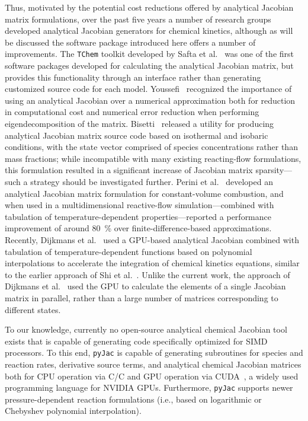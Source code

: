 \documentclass[preprint,12pt]{elsarticle}
\def\CC{{C\nolinebreak[4]\hspace{-.05em}\raisebox{.4ex}{\footnotesize ++}}}
\begin{document}
Thus, motivated by the potential cost reductions offered by analytical Jacobian matrix formulations, over the past five years a number of research groups developed analytical Jacobian generators for chemical kinetics, although as will be discussed the software package introduced here offers a number of improvements.
The \texttt{TChem} toolkit developed by Safta et al.~\cite{Safta:2011vn} was one of the first software packages developed for calculating the analytical Jacobian matrix, but provides this functionality through an interface rather than generating customized source code for each model.
Youssefi~\cite{Youssefi:2011tm} recognized the importance of using an analytical Jacobian over a numerical approximation both for reduction in computational cost and numerical error reduction when performing eigendecomposition of the matrix.
Bisetti~\cite{Bisetti:2012jw} released a utility for producing analytical Jacobian matrix source code based on isothermal and isobaric conditions, with the state vector comprised of species concentrations rather than mass fractions; while incompatible with many existing reacting-flow formulations, this formulation resulted in a significant increase of Jacobian matrix sparsity---such a strategy should be investigated further.
Perini et al.~\cite{Perini:2012gy} developed an analytical Jacobian matrix formulation for constant-volume combustion, and when used in a multidimensional reactive-flow simulation---combined with tabulation of temperature-dependent properties---reported a performance improvement of around \SI{80}{\percent} over finite-difference-based approximations.
Recently, Dijkmans et al.~\cite{Dijkmans:2014bb} used a GPU-based analytical Jacobian combined with tabulation of temperature-dependent functions based on polynomial interpolations to accelerate the integration of chemical kinetics equations, similar to the earlier approach of Shi et al.~\cite{Shi:2011aa}.
Unlike the current work, the approach of Dijkmans et al.~\cite{Dijkmans:2014bb} used the GPU to calculate the elements of a single Jacobian matrix in parallel, rather than a large number of matrices corresponding to different states.

To our knowledge, currently no open-source analytical chemical Jacobian tool exists that is capable of generating code specifically optimized for SIMD processors.
To this end, \texttt{pyJac} is capable of generating subroutines for species and reaction rates, derivative source terms, and analytical chemical Jacobian matrices both for CPU operation via C\slash \CC{} and GPU operation via CUDA~\cite{Nickolls:2008aa}, a widely used programming language for NVIDIA GPUs.
Furthermore, \texttt{pyJac} supports newer pressure-dependent reaction formulations (i.e., based on logarithmic or Chebyshev polynomial interpolation).
\end{document}
